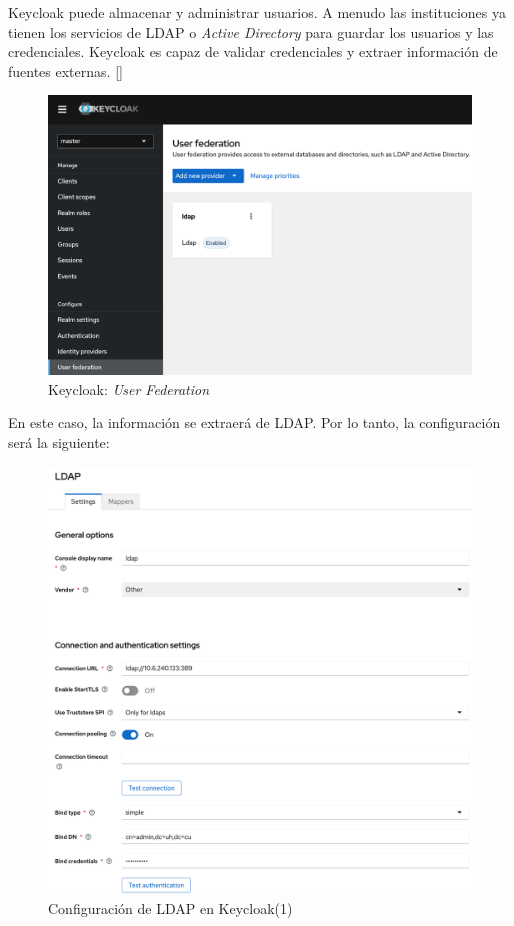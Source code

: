 \begin{enumerate}
	Keycloak puede almacenar y administrar usuarios. A menudo las instituciones ya tienen los servicios de LDAP o \textit{Active Directory} para guardar los usuarios y las credenciales. Keycloak es capaz de validar credenciales y extraer información de fuentes externas. [\cite{keycloak_2022}]
	
	\begin{figure}[H]
		\centering
		\includegraphics[width=1\linewidth]{"Graphics/keycloak_user federation"}
		\caption{Keycloak: \textit{User Federation}}
		\label{fig:keycloakuser-federation}
	\end{figure}
	
	
	En este caso, la información se extraerá de LDAP. Por lo tanto, la configuración será la siguiente:
	
	\begin{figure}[H]
		\centering
		\includegraphics[width=0.9\linewidth]{Graphics/keycloak_configuracion_ldap1}
		\caption{Configuración de LDAP en Keycloak(1)}
		\label{fig:keycloakconfiguracionldap1}
	\end{figure}
	

\end{enumerate}
